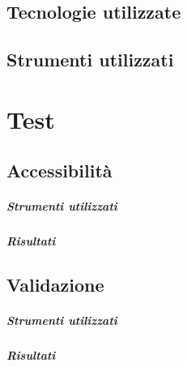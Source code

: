 \documentclass[12pt]{article}
\begin{document}
	\subsection{Tecnologie utilizzate}
	\subsection{Strumenti utilizzati}

	\section{Test}
	\subsection{Accessibilità}
	\subparagraph{Strumenti utilizzati}
	\subparagraph{Risultati}

	\subsection{Validazione}
	\subparagraph{Strumenti utilizzati}
	\subparagraph{Risultati}
\end{document}
